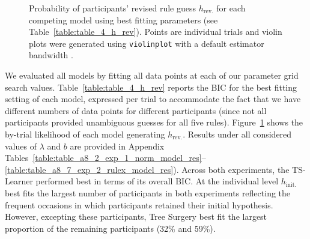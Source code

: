 \documentclass[doc,natbib,floatsintext]{apa7}
\newcommand{\hr}{h_{\mathrm{rev.}}}
\newcommand{\hi}{h_{\mathrm{init.}}}
\begin{document}
\begin{figure}[!t]
    \begin{center}
    \end{center}
    \caption{Probability of participants' revised rule guess $\hr$ for each competing model using best fitting parameters (see Table~\ref{table:table_4_h_rev}). Points are individual trials and violin plots were generated using {\tt violinplot} \citep{hunter2007matplotlib} with a default estimator bandwidth .}
    \label{fig:fig_7_mean_prob}
\end{figure}


We evaluated all models by fitting all data points at each of our parameter grid search values. Table~\ref{table:table_4_h_rev} reports the BIC for the best fitting setting of each model, expressed per trial to accommodate the fact that we have different numbers of data points for different participants (since not all participants provided unambiguous guesses for all five rules). Figure~\ref{fig:fig_7_mean_prob} shows the by-trial likelihood of each model generating $\hr$. Results under all considered values of $\lambda$ and $b$ are provided in Appendix Tables~\ref{table:table_a8_2_exp_1_norm_model_res}--\ref{table:table_a8_7_exp_2_rulex_model_res}). Across both experiments, the TS-Learner performed best in terms of its overall BIC. At the individual level $\hi$ best fits the largest number of participants in both experiments reflecting the frequent occasions in which participants retained their initial hypothesis. However, excepting these participants, Tree Surgery best fit the largest proportion of the remaining participants (32\% and 59\%). 
\end{document}
